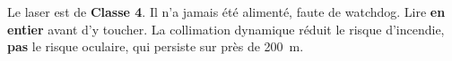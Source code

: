 \documentclass[11pt,a4paper]{article}
\begin{document}
\begin{avertissement}
Le laser est de \textbf{Classe 4}. Il n'a jamais été alimenté, faute de watchdog. Lire
 \textbf{en entier} avant d'y toucher. La
collimation dynamique réduit le risque d'incendie, \textbf{pas} le risque oculaire, qui
persiste sur près de 200~m.
\end{avertissement}

\newpage


\end{document}
